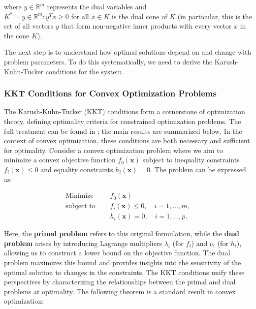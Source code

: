 \documentclass{article}
\begin{document}
where $y \in \mathbb{R}^m$ represents the dual variables and $K^* = {y \in \mathbb{R}^m : y^T x \geq 0 \text{ for all } x \in K}$ is the dual cone of $K$ (in particular, this is the set of all vectors \( y \) that form non-negative inner products with every vector \( x \) in the cone \( K \)). 

The next step is to understand how optimal solutions depend on and change with problem parameters. To do this systematically, we need to derive the Karush-Kuhn-Tucker conditions for the system. 

\subsubsection{KKT Conditions for Convex Optimization Problems}

The Karush-Kuhn-Tucker (KKT) conditions form a cornerstone of optimization theory, defining optimality criteria for constrained optimization problems. The full treatment can be found in \citep{boyd2004convex}; the main results are summarized below. In the context of convex optimization, these conditions are both necessary and sufficient for optimality. Consider a convex optimization problem where we aim to minimize a convex objective function $f_0(\mathbf{x})$ subject to inequality constraints $f_i(\mathbf{x}) \leq 0$ and equality constraints $h_i(\mathbf{x}) = 0$. The problem can be expressed as:

\begin{align*}
    \text{Minimize } & \quad f_0(\mathbf{x}) \\
    \text{subject to } & \quad f_i(\mathbf{x}) \leq 0, \quad i = 1, \dots, m, \\
    & \quad h_i(\mathbf{x}) = 0, \quad i = 1, \dots, p.
\end{align*}

Here, the \textbf{primal problem} refers to this original formulation, while the \textbf{dual problem} arises by introducing Lagrange multipliers $\lambda_i$ (for $f_i$) and $\nu_i$ (for $h_i$), allowing us to construct a lower bound on the objective function. The dual problem maximizes this bound and provides insights into the sensitivity of the optimal solution to changes in the constraints. The KKT conditions unify these perspectives by characterizing the relationships between the primal and dual problems at optimality. The following theorem is a standard result in convex optimization:
\end{document}
